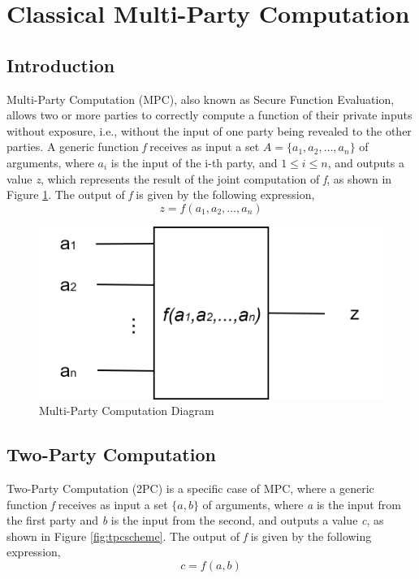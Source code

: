 \section{Classical Multi-Party Computation}

\begin{refsection}

\subsection{Introduction}
Multi-Party Computation (MPC), also known as Secure Function Evaluation, allows two or more parties
to correctly compute a function of their private inputs without exposure, i.e., without
the input of one party being revealed to the other parties.
A generic function \textit{f} receives as input a set $A = \{a_1,a_2,\dots,a_n\}$
of arguments, where $a_i$ is the input of the i-th party, and $1\leq i\leq n$, and outputs a value \textit{z}, which represents the result
of the joint computation of \textit{f}, as shown in Figure \ref{fig:mpcscheme}.
The output of \textit{f} is given by the following expression,
\begin{equation}\label{eq:mpc}
z = f(a_1,a_2,\dots,a_n)
\end{equation}

\renewcommand{\figurename}{Figure}
\begin{figure}[H]
\centering
\includegraphics[width=.45\linewidth]{./sdf/classical_mpc/figures/mpc_scheme}
\caption{Multi-Party Computation Diagram}
\label{fig:mpcscheme}
\end{figure}
\pagebreak

\subsection{Two-Party Computation}
Two-Party Computation (2PC) is a specific case of MPC, where a generic function \textit{f} receives as input a set $\{a,b\}$
of arguments, where \textit{a} is the input from the first party and \textit{b} is the input from the second,
and outputs a value \textit{c}, as shown in Figure \ref{fig:tpcscheme}.
The output of \textit{f} is given by the following expression,
\begin{equation}\label{eq:tpc}
c = f(a,b)
\end{equation}


\end{refsection}
